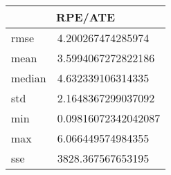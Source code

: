 \begin{table}[!ht] 
 \centering 
 \begin{tabular}{|l|l|} \hline 
 \multicolumn{2}{|c|}{RPE/ATE} \\ \hline 
 rmse & 4.200267474285974 \\ \hline 
mean & 3.5994067272822186 \\ \hline 
median & 4.632339106314335 \\ \hline 
std & 2.1648367299037092 \\ \hline 
min & 0.09816072342042087 \\ \hline 
max & 6.066449574984355 \\ \hline 
sse & 3828.367567653195 \\ \hline 
\end{tabular} 
 \end{table}